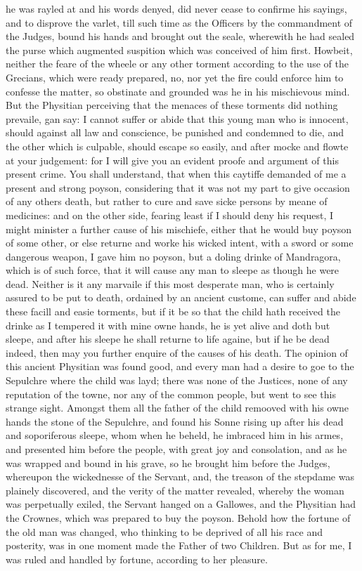 he was rayled at and his words denyed, did never cease to confirme his sayings,
and to disprove the varlet, till such time as the Officers by the commandment
of the Judges, bound his hands and brought out the seale, wherewith he had
sealed the purse which augmented suspition which was conceived of him first.
Howbeit, neither the feare of the wheele or any other torment according to the
use of the Grecians, which were ready prepared, no, nor yet the fire could
enforce him to confesse the matter, so obstinate and grounded was he in his
mischievous mind. But the Physitian perceiving that the menaces of these
torments did nothing prevaile, gan say: I cannot suffer or abide that this
young man who is innocent, should against all law and conscience, be punished
and condemned to die, and the other which is culpable, should escape so easily,
and after mocke and flowte at your judgement: for I will give you an evident
proofe and argument of this present crime. You shall understand, that when this
caytiffe demanded of me a present and strong poyson, considering that it was
not my part to give occasion of any others death, but rather to cure and save
sicke persons by meane of medicines: and on the other side, fearing least if I
should deny his request, I might minister a further cause of his mischiefe,
either that he would buy poyson of some other, or else returne and worke his
wicked intent, with a sword or some dangerous weapon, I gave him no poyson, but
a doling drinke of Mandragora, which is of such force, that it will cause any
man to sleepe as though he were dead. Neither is it any marvaile if this most
desperate man, who is certainly assured to be put to death, ordained by an
ancient custome, can suffer and abide these facill and easie torments, but if
it be so that the child hath received the drinke as I tempered it with mine
owne hands, he is yet alive and doth but sleepe, and after his sleepe he shall
returne to life againe, but if he be dead indeed, then may you further enquire
of the causes of his death. The opinion of this ancient Physitian was found
good, and every man had a desire to goe to the Sepulchre where the child was
layd; there was none of the Justices, none of any reputation of the towne, nor
any of the common people, but went to see this strange sight. Amongst them all
the father of the child remooved with his owne hands the stone of the
Sepulchre, and found his Sonne rising up after his dead and soporiferous
sleepe, whom when he beheld, he imbraced him in his armes, and presented him
before the people, with great joy and consolation, and as he was wrapped and
bound in his grave, so he brought him before the Judges, whereupon the
wickednesse of the Servant, and, the treason of the stepdame was plainely
discovered, and the verity of the matter revealed, whereby the woman was
perpetually exiled, the Servant hanged on a Gallowes, and the Physitian had the
Crownes, which was prepared to buy the poyson. Behold how the fortune of the
old man was changed, who thinking to be deprived of all his race and posterity,
was in one moment made the Father of two Children. But as for me, I was ruled
and handled by fortune, according to her pleasure.

